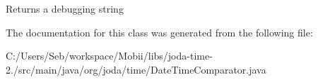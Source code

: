 \begin{DoxyReturn}{Returns}
a debugging string 
\end{DoxyReturn}


The documentation for this class was generated from the following file\-:\begin{DoxyCompactItemize}
\item 
C\-:/\-Users/\-Seb/workspace/\-Mobii/libs/joda-\/time-\/2./src/main/java/org/joda/time/Date\-Time\-Comparator.\-java\end{DoxyCompactItemize}
